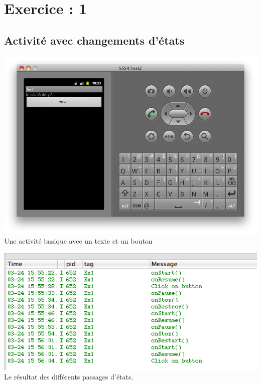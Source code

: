 



\usepackage{color}
\usepackage{listings}


\lstset{language=java,captionpos=b} 



	
	
	
	
	\section{Exercice : 1}
		\subsection{Activité avec changements d'états}
		
		\begin{center}
			\includegraphics[width=1\textwidth]{./images/ex1a.png}
			Une activité basique avec un texte et un bouton
		\end{center}		
		
		\begin{center}
			\includegraphics[width=1\textwidth]{./images/ex1.png}
			Le résultat des différents passages d'états.
		\end{center}		
